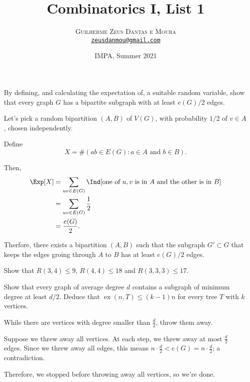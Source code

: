 \documentclass[10pt, a4paper]{article}
\title{\textbf{\textsf{Combinatorics I, List 1}}}
\author{\textsc{Guilherme Zeus Dantas e Moura}\\[2pt]\href{mailto:zeusdanmou@gmail.com}{\texttt{zeusdanmou@gmail.com}}}
\date{IMPA, Summer 2021}
\DeclareMathOperator\ex{ex}
\begin{document}
\maketitle

\begin{prob}
	By defining, and calculating the expectation of, a suitable random variable, show that every graph $G$ has a bipartite subgraph with at least $e(G)/2$ edges.
\end{prob}
\begin{sol}
	Let's pick a random bipartition $(A, B)$ of $V(G)$, with probability $1/2$ of $v \in A$, chosen independently.

	Define \[
		X = \#\left( ab \in E(G) : a \in A \text{ and } b \in B\right).
	\]

	Then,
	\begin{align*}
		\Exp[X] &= \sum_{uv \in E(G)} \Ind[\text{one of $u, v$ is in $A$ and the other is in $B$}]\\
				&= \sum_{uv \in E(G)} \frac{1}{2}\\
				&= \frac{e(G)}{2}.
	\end{align*}

	Therfore, there exists a bipartition $(A, B)$ such that the subgraph $G' \subset G$ that keeps the edges groing through $A$ to $B$ has at least $e(G)/2$ edges.
\end{sol}

\newpage
\begin{prob}
	Show that $R(3, 4) \leqslant 9$, $R(4, 4) \leqslant 18$ and $R(3, 3, 3) \leqslant 17$.
\end{prob}
\begin{sol}

\end{sol}

\newpage
\begin{prob}
	Show that every graph of average degree $d$ contains a subgraph of minimum degree at least $d/2$. Deduce that  $\ex(n, T) \leqslant (k-1)n$ for every tree $T$ with $k$ vertices.
\end{prob}
\begin{sol}	
		While there are vertices with degree smaller than $\frac{d}{2}$, throw them away.

		Suppose we threw away all vertices. At each step, we threw away at most $\frac{d}{2}$ edges. Since we threw away all edges, this means $n \cdot \frac{d}{2} < e(G) = n \cdot \frac{d}{2}$; a contradiction.

		Therefore, we stopped before throwing away all vertices, so we're done. 
\end{sol}
\end{document}
